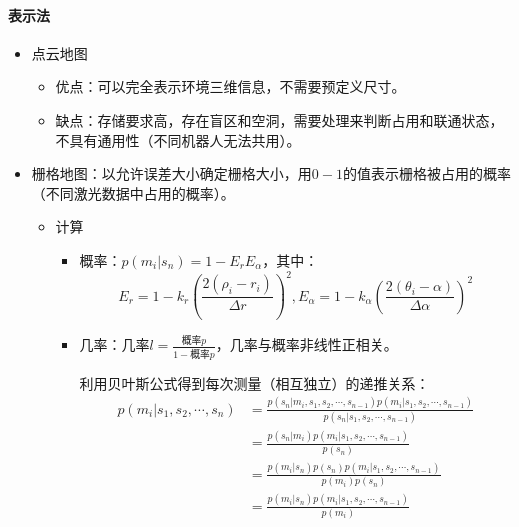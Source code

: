 \documentclass[
12pt, %
a4paper, 
oneside, %
headinclude,footinclude, %
]{scrartcl}
\begin{document}
\paragraph{表示法}
\begin{itemize}
\item 点云地图
\begin{itemize}
\item 优点：可以完全表示环境三维信息，不需要预定义尺寸。
\item 缺点：存储要求高，存在盲区和空洞，需要处理来判断占用和联通状态，不具有通用性（不同机器人无法共用）。
\end{itemize}
\item 栅格地图：以允许误差大小确定栅格大小，用$ 0 - 1 $的值表示栅格被占用的概率（不同激光数据中占用的概率）。
\begin{itemize}
\item 计算
\begin{itemize}
\item 概率：$ p(m_i|s_n) = 1 - E_r E_\alpha $，其中：
$$ E_r = 1 - k_r(\frac{2(\rho_i - r_i)}{\Delta r})^2, E_\alpha = 1 - k_\alpha(\frac{2(\theta_i - \alpha)}{\Delta\alpha})^2 $$
\item 几率：$ \text{几率}l = \frac{\text{概率}p}{1 - \text{概率}p} $，几率与概率非线性正相关。

利用贝叶斯公式得到每次测量（相互独立）的递推关系：
\begin{align*}
p(m_i|s_1, s_2, \cdots, s_n)
& = \frac{p(s_n|m_i, s_1, s_2, \cdots, s_{n - 1})p(m_i|s_1, s_2, \cdots, s_{n - 1})}{p(s_n|s_1, s_2, \cdots, s_{n - 1})} \\
&= \frac{p(s_n|m_i)p(m_i|s_1, s_2, \cdots, s_{n - 1})}{p(s_n)} \\
&= \frac{p(m_i|s_n)p(s_n)p(m_i|s_1, s_2, \cdots, s_{n - 1})}{p(m_i)p(s_n)} \\
&= \frac{p(m_i|s_n)p(m_i|s_1, s_2, \cdots, s_{n - 1})}{p(m_i)}
\end{align*}


\end{itemize}
\end{itemize}
\end{itemize}
\end{document}
